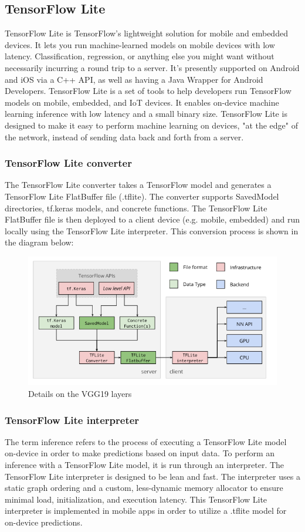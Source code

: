\subsection{TensorFlow Lite}
TensorFlow Lite is TensorFlow’s lightweight solution for mobile and embedded devices. It lets you run machine-learned models on mobile devices with low latency. Classification, regression, or anything else you might want without necessarily incurring a round trip to a server. It’s presently supported on Android and iOS via a C++ API, as well as having a Java Wrapper for Android Developers. TensorFlow Lite is a set of tools to help developers run TensorFlow models on mobile, embedded, and IoT devices. It enables on-device machine learning inference with low latency and a small binary size. TensorFlow Lite is designed to make it easy to perform machine learning on devices, "at the edge" of the network, instead of sending data back and forth from a server.
\subsubsection{TensorFlow Lite converter}
The TensorFlow Lite converter takes a TensorFlow model and generates a TensorFlow Lite FlatBuffer file (.tflite). The converter supports SavedModel directories, tf.keras models, and concrete functions. The TensorFlow Lite FlatBuffer file is then deployed to a client device (e.g. mobile, embedded) and run locally using the TensorFlow Lite interpreter. This conversion process is shown in the diagram below:

\begin{figure}[H]
	\label{ss}
	\centering
	\includegraphics[width=15cm,keepaspectratio]{tflite-converter-workflow.png}
	\caption{Details on the VGG19 layers}
\end{figure}

\subsubsection{TensorFlow Lite interpreter}
The term inference refers to the process of executing a TensorFlow Lite model on-device in order to make predictions based on input data. To perform an inference with a TensorFlow Lite model, it is run through an interpreter. The TensorFlow Lite interpreter is designed to be lean and fast. The interpreter uses a static graph ordering and a custom, less-dynamic memory allocator to ensure minimal load, initialization, and execution latency. This TensorFlow Lite interpreter is implemented in mobile apps in order to utilize a .tflite model for on-device predictions.

